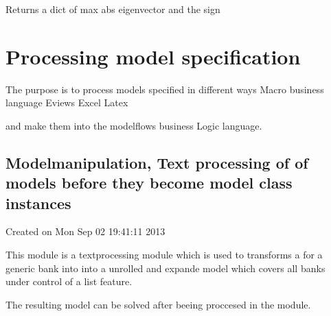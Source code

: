 \documentclass[letterpaper,10pt,english]{sphinxmanual}
\begin{document}
\begin{fulllineitems}

\begin{fulllineitems}
\label{\detokenize{index:modelnewton.newton_diff.get_feedback}}
\pysigstartsignatures
{}
\pysigstopsignatures
\sphinxAtStartPar
Returns a dict of max abs eigenvector and the sign

\end{fulllineitems}


\end{fulllineitems}



\chapter{Processing model specification}
\label{\detokenize{index:processing-model-specification}}
\sphinxAtStartPar
The purpose is to process models specified in different ways
\sphinxhyphen{} Macro business language
\sphinxhyphen{} Eviews
\sphinxhyphen{} Excel
\sphinxhyphen{} Latex

\sphinxAtStartPar
and make them into the modelflows business Logic language.


\section{Modelmanipulation, Text processing of of models before they become model class instances}
\label{\detokenize{index:module-modelmanipulation}}\label{\detokenize{index:modelmanipulation-text-processing-of-of-models-before-they-become-model-class-instances}}
\sphinxAtStartPar
Created on Mon Sep 02 19:41:11 2013

\sphinxAtStartPar
This module is a textprocessing module which is used to transforms a  for a generic bank into into a unrolled and
expande model which covers all banks \sphinxhyphen{} under  control of a list feature.

\sphinxAtStartPar
The resulting model can be solved after beeing proccesed in the  module.
\end{document}
